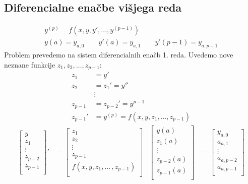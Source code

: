 \begin{multicols}{5}
\subsection*{Diferencialne enačbe višjega reda}
\begin{gather*}    
    y^{(p)} = f(x, y, y', \dots, y^{(p-1)}) \\
    y(a) = y_{a,0} \qquad y'(a) = y_{a,1} \qquad y'(p-1) = y_{a,p-1} 
\end{gather*}   
Problem prevedemo na sistem diferencialnih enačb 1. reda.
Uvedemo nove neznane funkcije $z_1, z_2, \dots, z_{p-1}$:
\begin{align*}
    z_1 &= y' \\
    z_2 &= z_1' = y'' \\
    & \vdots \\
    z_{p-1} &= z_{p-2}' = y^{p-1} \\
    z_{p-1}' &= y^{(p)} = f(x, y, z_1, \dots, z_{p-1})
\end{align*}
\begin{align*}
    \begin{bmatrix}
        y \\
        z_1 \\
        \vdots \\
        z_{p-2} \\
        z_{p-1} \\
    \end{bmatrix}'
    &=
    \begin{bmatrix}
        z_1 \\
        z_2 \\
        \vdots \\
        z_{p-1} \\
        f(x,y, z_1, ...\, , z_{p-1}) \\
    \end{bmatrix}
    &
    \begin{bmatrix}
        y(a) \\
        z_1(a) \\
        \vdots \\
        z_{p-2}(a) \\
        z_{p-1}(a) \\
    \end{bmatrix}
    &=
    \begin{bmatrix}
        y_{a,0} \\
        a_{a,1} \\
        \vdots \\
        a_{a,p-2} \\
        a_{a,p-1} \\
    \end{bmatrix}
\end{align*}


\end{multicols}
